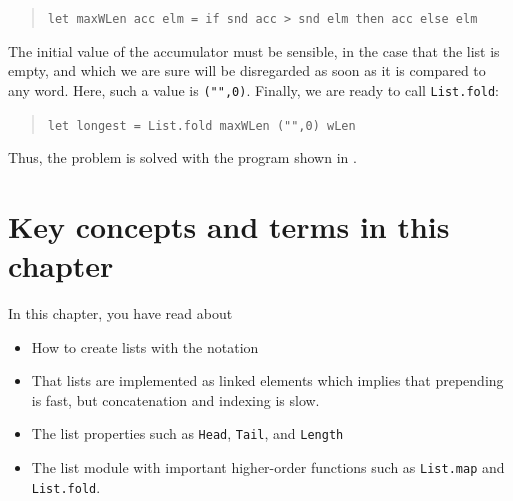\documentclass[fsharpNotes.tex]{subfiles}
\begin{document}
\begin{quote}
  \lstinline{let maxWLen acc elm = if snd acc > snd elm then acc else elm}
\end{quote}
The initial value of the accumulator must be sensible, in the case that the list is empty, and which we are sure will be disregarded as soon as it is compared to any word. Here, such a value is \lstinline{("",0)}. Finally, we are ready to call \lstinline{List.fold}:
\begin{quote}
  \lstinline{let longest = List.fold maxWLen ("",0) wLen}
\end{quote}
Thus, the problem is solved with the program shown in .
%
%

\section{Key concepts and terms in this chapter}
In this chapter, you have read about
\begin{itemize}
\item How to create lists with the \lexeme{[]} notation
\item That lists are implemented as linked elements which implies that prepending is fast, but concatenation and indexing is slow.
\item The list properties such as \lstinline{Head}, \lstinline{Tail}, and \lstinline{Length}
\item The list module with important higher-order functions such as \lstinline{List.map} and \lstinline{List.fold}.
\end{itemize}
\end{document}
